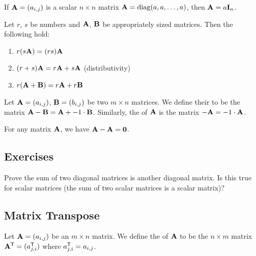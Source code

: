 \begin{example}
If $\mathbf{A}=(a_{i,j})$ is a scalar $n\times n$ matrix $\mathbf{A}=\operatorname{diag}(a,a,\dots,a)$, then
$\mathbf{A} = a\mathbf{I}_{n}$.
\end{example}

Let $r$, $s$ be numbers and $\mathbf{A}$, $\mathbf{B}$ be appropriately sized
matrices. Then the following hold:
\begin{enumerate}
\item $r(s\mathbf{A})=(rs)\mathbf{A}$
\item $(r+s)\mathbf{A}=r\mathbf{A}+s\mathbf{A}$ (distributivity)
\item $r(\mathbf{A}+\mathbf{B})=r\mathbf{A}+r\mathbf{B}$
\end{enumerate}

\begin{definition}
Let $\mathbf{A}=(a_{i,j})$, $\mathbf{B}=(b_{i,j})$ be two $m\times n$
matrices. We define their  to be the matrix $\mathbf{A}-\mathbf{B} = \mathbf{A} + -1\cdot\mathbf{B}$.
Similarly, the  of $\mathbf{A}$ is the matrix $-\mathbf{A}=-1\cdot\mathbf{A}$.
\end{definition}

\begin{proposition}
For any matrix $\mathbf{A}$, we have $\mathbf{A}-\mathbf{A}=\mathbf{0}$.
\end{proposition}

\subsection*{Exercises}

\begin{exercise}
Prove the sum of two diagonal matrices is another diagonal matrix. Is
this true for scalar matrices (the sum of two scalar matrices is a
scalar matrix)?
\end{exercise}

\subsection{Matrix Transpose}

\begin{definition}
Let $\mathbf{A}=(a_{i,j})$ be an $m\times n$ matrix.
We define the  of $\mathbf{A}$ to be the $n\times m$ matrix $\mathbf{A}^{\mathsf{T}}=(a^{\mathsf{T}}_{j,i})$
where $a^{\mathsf{T}}_{j,i}=a_{i,j}$.
\end{definition}

